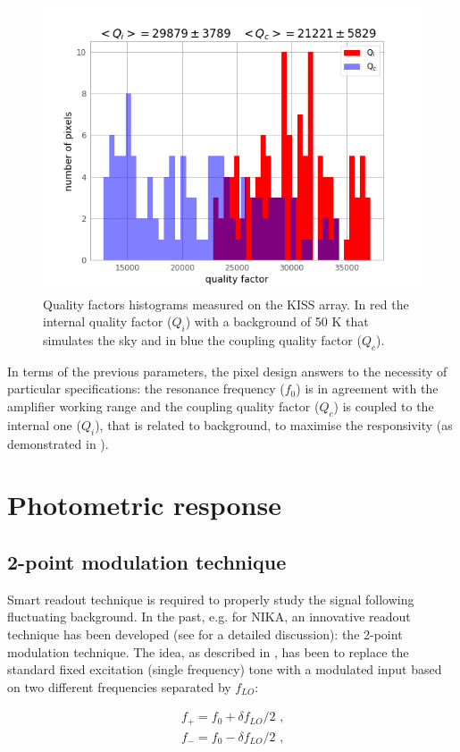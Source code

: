 \documentclass[twocolumn,traditabstract]{aa}\\
\begin{document}
\begin{figure}[htf]
	\centering
	\includegraphics[width=.5\textwidth]{3.acqui/Q_hist.png}
	\caption{Quality factors histograms measured on the KISS array. In red the internal quality factor ($Q_i$) with a background of 50 K that simulates the sky and in blue the coupling quality factor ($Q_c$).}
	\label{fig:hist}
\end{figure}

\noindent In terms of the previous parameters, the pixel design answers to the necessity of particular specifications: the resonance frequency ($f_0$) is in agreement with the amplifier working range and the coupling quality factor ($Q_c$) is coupled to the internal one ($Q_i$), that is related to background, to maximise the responsivity (as demonstrated in \cite{Gao}).

\section{Photometric response}
\label{sec:photo}

\subsection{2-point modulation technique}
\label{2-point}
Smart readout technique is required to properly study the signal following fluctuating background. In the past, e.g. for NIKA, an innovative readout technique has been developed (see \cite{Calvo2013} for a detailed discussion): the 2-point modulation technique.
The idea, as described in \cite{Catalano2014} , has been to replace the standard fixed excitation (single frequency) tone with a modulated input based on two different frequencies separated by $f_{LO}$: 

\begin{equation}
\begin{align}
f_+ = f_0 + \delta f_{LO}/2 \text{ ,}
\\
f_- = f_0 - \delta f_{LO}/2 \text{ ,}
\end{align}
\end{equation}
\end{document}
